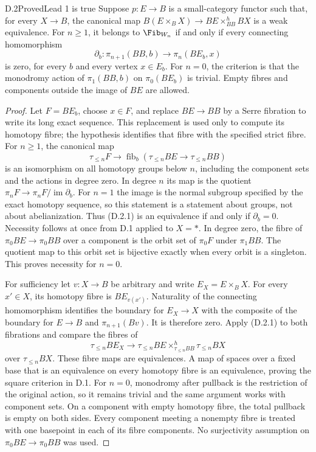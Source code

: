 \begin{claim}{D.2}{Proved}{Lead 1 is true}
Suppose $p:E\to B$ is a small-category functor such that, for every $X\to B$, the canonical map $B(E\times_BX)\to BE\times^h_{BB}BX$ is a weak equivalence. For $n\geq1$, it belongs to $\Fib_{W_n}$ if and only if every connecting homomorphism
\[
\partial_b:\pi_{n+1}(BB,b)\longrightarrow\pi_n(BE_b,x)
\]
is zero, for every $b$ and every vertex $x\in E_b$. For $n=0$, the criterion is that the monodromy action of $\pi_1(BB,b)$ on $\pi_0(BE_b)$ is trivial. Empty fibres and components outside the image of $BE$ are allowed.
\end{claim}
\begin{proof}
Let $F=BE_b$, choose $x\in F$, and replace $BE\to BB$ by a Serre fibration to write its long exact sequence. This replacement is used only to compute its homotopy fibre; the hypothesis identifies that fibre with the specified strict fibre. For $n\geq1$, the canonical map
\[
\tau_{\leq n}F\longrightarrow
\operatorname{fib}_b(\tau_{\leq n}BE\to\tau_{\leq n}BB)
\tag{D.2.1}
\]
is an isomorphism on all homotopy groups below $n$, including the component sets and the actions in degree zero. In degree $n$ its map is the quotient
$\pi_nF\to\pi_nF/\operatorname{im}\partial_b$.
For $n=1$ the image is the normal subgroup specified by the exact homotopy sequence, so this statement is a statement about groups, not about abelianization. Thus (D.2.1) is an equivalence if and only if $\partial_b=0$. Necessity follows at once from D.1 applied to $X=*$. In degree zero, the fibre of $\pi_0BE\to\pi_0BB$ over a component is the orbit set of $\pi_0F$ under $\pi_1BB$. The quotient map to this orbit set is bijective exactly when every orbit is a singleton. This proves necessity for $n=0$.

For sufficiency let $v:X\to B$ be arbitrary and write $E_X=E\times_BX$. For every $x'\in X$, its homotopy fibre is $BE_{v(x')}$. Naturality of the connecting homomorphism identifies the boundary for $E_X\to X$ with the composite of the boundary for $E\to B$ and $\pi_{n+1}(Bv)$. It is therefore zero. Apply (D.2.1) to both fibrations and compare the fibres of
\[
\tau_{\leq n}BE_X\longrightarrow
\tau_{\leq n}BE\times^h_{\tau_{\leq n}BB}\tau_{\leq n}BX
\]
over $\tau_{\leq n}BX$. These fibre maps are equivalences. A map of spaces over a fixed base that is an equivalence on every homotopy fibre is an equivalence, proving the square criterion in D.1. For $n=0$, monodromy after pullback is the restriction of the original action, so it remains trivial and the same argument works with component sets. On a component with empty homotopy fibre, the total pullback is empty on both sides. Every component meeting a nonempty fibre is treated with one basepoint in each of its fibre components. No surjectivity assumption on $\pi_0BE\to\pi_0BB$ was used.
\end{proof}

